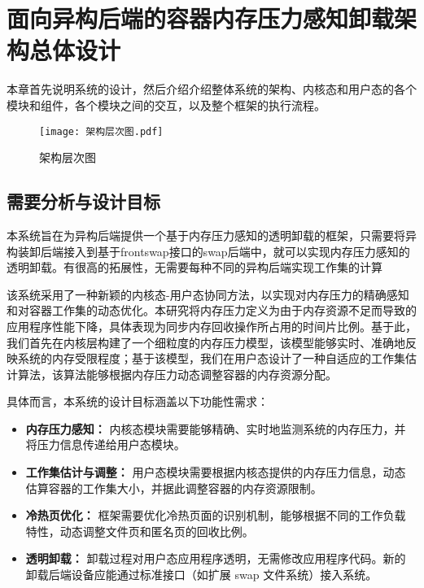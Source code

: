 \chapter{面向异构后端的容器内存压力感知卸载架构总体设计}

本章首先说明系统的设计，然后介绍介绍整体系统的架构、内核态和用户态的各个模块和组件，各个模块之间的交互，以及整个框架的执行流程。

\begin{figure}[h]
    \centering
    \texttt{[image: 架构层次图.pdf]}
    \caption{架构层次图}
    \label{fig:system_architecture_hierarchy}
\end{figure}

\section{需要分析与设计目标}

本系统旨在为异构后端提供一个基于内存压力感知的透明卸载的框架，只需要将异构装卸后端接入到基于frontswap接口的swap后端中，就可以实现内存压力感知的透明卸载。有很高的拓展性，无需要每种不同的异构后端实现工作集的计算

该系统采用了一种新颖的内核态-用户态协同方法，以实现对内存压力的精确感知和对容器工作集的动态优化。本研究将内存压力定义为由于内存资源不足而导致的应用程序性能下降，具体表现为同步内存回收操作所占用的时间片比例。基于此，我们首先在内核层构建了一个细粒度的内存压力模型，该模型能够实时、准确地反映系统的内存受限程度；基于该模型，我们在用户态设计了一种自适应的工作集估计算法，该算法能够根据内存压力动态调整容器的内存资源分配。

具体而言，本系统的设计目标涵盖以下功能性需求：

\begin{itemize}
    \item \textbf{内存压力感知：} 内核态模块需要能够精确、实时地监测系统的内存压力，并将压力信息传递给用户态模块。
    \item \textbf{工作集估计与调整：} 用户态模块需要根据内核态提供的内存压力信息，动态估算容器的工作集大小，并据此调整容器的内存资源限制。
    \item \textbf{冷热页优化：} 框架需要优化冷热页面的识别机制，能够根据不同的工作负载特性，动态调整文件页和匿名页的回收比例。
    \item \textbf{透明卸载：} 卸载过程对用户态应用程序透明，无需修改应用程序代码。新的卸载后端设备应能通过标准接口（如扩展 swap 文件系统）接入系统。
\end{itemize}

